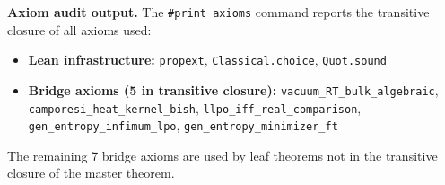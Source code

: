\documentclass[11pt,a4paper]{article}
\theoremstyle{plain}
\theoremstyle{definition}
\begin{document}
\medskip\noindent
\textbf{Axiom audit output.}  The \texttt{\#print axioms} command
reports the transitive closure of all axioms used:
\begin{itemize}[nosep]
\item \textbf{Lean infrastructure:} \texttt{propext},
  \texttt{Classical.choice}, \texttt{Quot.sound}
\item \textbf{Bridge axioms (5 in transitive closure):}
  \texttt{vacuum\_RT\_bulk\_algebraic},
  \texttt{camporesi\_heat\_kernel\_bish},
  \texttt{llpo\_iff\_real\_comparison},
  \texttt{gen\_entropy\_infimum\_lpo},
  \texttt{gen\_entropy\_minimizer\_ft}
\end{itemize}
The remaining 7 bridge axioms are used by leaf theorems not in the
transitive closure of the master theorem.

\end{document}
